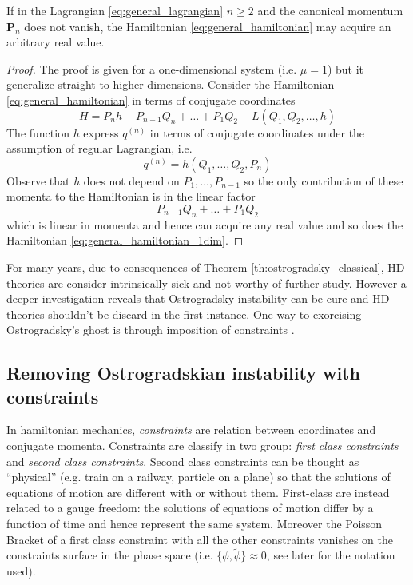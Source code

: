 \begin{theorem}[Ostrogradsky] \label{th:ostrogradsky_classical}
  If in the Lagrangian \eqref{eq:general_lagrangian} $n \geq 2$ and the
  canonical momentum $\bm{P}_n$ does not vanish, the Hamiltonian
  \eqref{eq:general_hamiltonian} may acquire an arbitrary real value.
\end{theorem}
\begin{proof}
  The proof is given for a one-dimensional system (i.e. $\mu=1$) but it
  generalize straight to higher dimensions. Consider the Hamiltonian
  \eqref{eq:general_hamiltonian} in terms of conjugate coordinates
  \begin{equation} \label{eq:general_hamiltonian_1dim}
    H = P_n h + P_{n-1} Q_n + \ldots + P_1 Q_2 - L(Q_1, Q_2, \ldots, h)
  \end{equation}
  The function $h$ express $q^{(n)}$ in terms of conjugate coordinates under
  the assumption of regular Lagrangian, i.e.
  \begin{equation*}
    q^{(n)} = h(Q_1, \ldots, Q_2, P_n)
  \end{equation*}
  Observe that $h$ does not depend on $P_1, \ldots, P_{n-1}$ so the only
  contribution of these momenta to the Hamiltonian is in the linear factor
  \begin{equation*}
    P_{n-1} Q_n + \ldots + P_1 Q_2
  \end{equation*}
  which is linear in momenta and hence can acquire any real value and so does
  the Hamiltonian \eqref{eq:general_hamiltonian_1dim}.
\end{proof}

For many years, due to consequences of Theorem \ref{th:ostrogradsky_classical},
HD theories are consider intrinsically sick and not worthy of further study.
However a deeper investigation reveals that Ostrogradsky instability can be cure
and HD theories shouldn't be discard in the first instance. One way to
exorcising Ostrogradsky's ghost is through imposition of constraints
\cite{Chen13}.


\subsection{Removing Ostrogradskian instability with constraints}

In hamiltonian mechanics, \emph{constraints} are relation between coordinates
and conjugate momenta. Constraints are classify in two group: \emph{first class
constraints} and \emph{second class constraints}. Second class constraints can
be thought as ``physical'' (e.g. train on a railway, particle on a plane) so
that the solutions of equations of motion are different with or without them.
First-class are instead related to a gauge freedom: the solutions of equations
of motion differ by a function of time and hence represent the same system.
Moreover the Poisson Bracket of a first class constraint with all the other
constraints vanishes on the constraints surface in the phase space (i.e.
$\{\phi, \tilde{\phi}\} \approx 0$, see later for the notation used).


